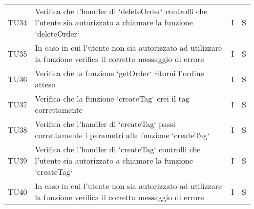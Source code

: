 \begin{center}
\begin{longtable}[!h]{p{45px} p{255px} p{35px} p{35px}}
        TU34          & Verifica che l'handler di `deleteOrder` controlli che l'utente sia autorizzato a chiamare la funzione `deleteOrder`                                                                              & I              & S              \\
        TU35          & In caso in cui l'utente non sia autorizzato ad utilizzare la funzione verifica il corretto messaggio di errore                                                                                   & I              & S              \\
        TU36          & Verifica che la funzione `getOrder` ritorni l'ordine atteso                                                                                                                                      & I              & S              \\
        TU37          & Verifica che la funzione `createTag` crei il tag correttamente                                                                                                                                   & I              & S              \\
        TU38          & Verifica che l'handler di `createTag` passi correttamente i parametri alla funzione `createTag`                                                                                                  & I              & S              \\
        TU39          & Verifica che l'handler di `createTag` controlli che l'utente sia autorizzato a chiamare la funzione `createTag`                                                                                  & I              & S              \\
        TU40          & In caso in cui l'utente non sia autorizzato ad utilizzare la funzione verifica il corretto messaggio di errore                                                                                   & I              & S              \\


\end{longtable}
\end{center}
